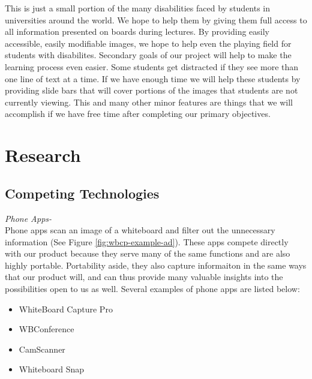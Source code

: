 \documentclass{article}
\begin{document}
This is just a small portion of the many disabilities faced by students in universities around the world. We hope to help them by giving them full access to all information presented on boards during lectures. By providing easily accessible, easily modifiable images, we hope to help even the playing field for students with disabilites.
Secondary goals of our project will help to make the learning process even easier. Some students get distracted if they see more than one line of text at a time. If we have enough time we will help these students by providing slide bars that will cover portions of the images that students are not currently viewing. This and many other minor features are things that we will accomplish if we have free time after completing our primary objectives. 

	\section{Research}
		\subsection*{Competing Technologies}
			
			\emph{Phone Apps-}\\
Phone apps scan an image of a whiteboard and filter out the unnecessary information (See Figure \ref{fig:wbcp-example-ad}). These apps compete directly with our product because they serve many of the same functions and are also highly portable. Portability aside, they also capture informaiton in the same ways that our product will, and can thus provide many valuable insights into the possibilities open to us as well. Several examples of phone apps are listed below:

			\begin{itemize}
				\item WhiteBoard Capture Pro
				\item WBConference
				\item CamScanner
				\item Whiteboard Snap
			\end{itemize} 
			
\end{document}
